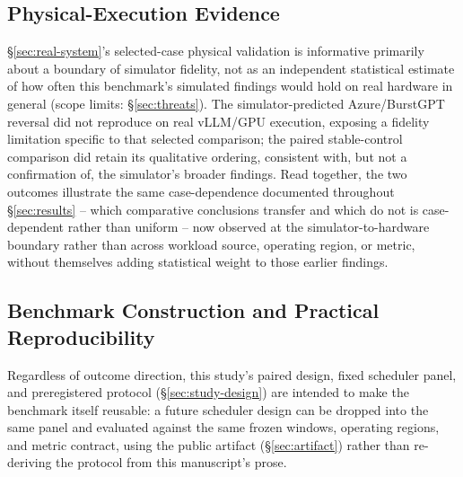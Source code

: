 \subsection{Physical-Execution Evidence}

\S\ref{sec:real-system}'s selected-case physical validation is informative
primarily about a boundary of simulator fidelity, not as an independent
statistical estimate of how often this benchmark's simulated findings
would hold on real hardware in general (scope limits:
\S\ref{sec:threats}). The simulator-predicted Azure/BurstGPT reversal did
not reproduce on real vLLM/GPU execution, exposing a fidelity limitation
specific to that selected comparison; the paired stable-control comparison
did retain its qualitative ordering, consistent with, but not a
confirmation of, the simulator's broader findings. Read together, the two
outcomes illustrate the same case-dependence documented throughout
\S\ref{sec:results} -- which comparative conclusions transfer and which do
not is case-dependent rather than uniform -- now observed at the
simulator-to-hardware boundary rather than across workload source,
operating region, or metric, without themselves adding statistical weight
to those earlier findings.

\subsection{Benchmark Construction and Practical Reproducibility}

Regardless of outcome direction, this study's paired design, fixed
scheduler panel, and preregistered protocol (\S\ref{sec:study-design})
are intended to make the benchmark itself reusable: a future scheduler
design can be dropped into the same panel and evaluated against the same
frozen windows, operating regions, and metric contract, using the public
artifact (\S\ref{sec:artifact}) rather than re-deriving the protocol
from this manuscript's prose.

